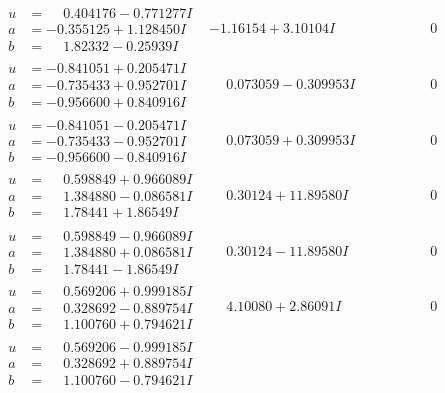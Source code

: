 \documentclass[1p]{elsarticle_modified}
\theoremstyle{definition}
\begin{document}
$$\begin{array}{c|c|c}
\begin{aligned}
u &= \phantom{-}0.404176 - 0.771277 I \\
a &= -0.355125 + 1.128450 I \\
b &= \phantom{-}1.82332 - 0.25939 I\end{aligned}
 & -1.16154 + 3.10104 I & \phantom{-0.000000 } 0 \\ \hline\begin{aligned}
u &= -0.841051 + 0.205471 I \\
a &= -0.735433 + 0.952701 I \\
b &= -0.956600 + 0.840916 I\end{aligned}
 & \phantom{-}0.073059 - 0.309953 I & \phantom{-0.000000 } 0 \\ \hline\begin{aligned}
u &= -0.841051 - 0.205471 I \\
a &= -0.735433 - 0.952701 I \\
b &= -0.956600 - 0.840916 I\end{aligned}
 & \phantom{-}0.073059 + 0.309953 I & \phantom{-0.000000 } 0 \\ \hline\begin{aligned}
u &= \phantom{-}0.598849 + 0.966089 I \\
a &= \phantom{-}1.384880 - 0.086581 I \\
b &= \phantom{-}1.78441 + 1.86549 I\end{aligned}
 & \phantom{-}0.30124 + 11.89580 I & \phantom{-0.000000 } 0 \\ \hline\begin{aligned}
u &= \phantom{-}0.598849 - 0.966089 I \\
a &= \phantom{-}1.384880 + 0.086581 I \\
b &= \phantom{-}1.78441 - 1.86549 I\end{aligned}
 & \phantom{-}0.30124 - 11.89580 I & \phantom{-0.000000 } 0 \\ \hline\begin{aligned}
u &= \phantom{-}0.569206 + 0.999185 I \\
a &= \phantom{-}0.328692 - 0.889754 I \\
b &= \phantom{-}1.100760 + 0.794621 I\end{aligned}
 & \phantom{-}4.10080 + 2.86091 I & \phantom{-0.000000 } 0 \\ \hline\begin{aligned}
u &= \phantom{-}0.569206 - 0.999185 I \\
a &= \phantom{-}0.328692 + 0.889754 I \\
b &= \phantom{-}1.100760 - 0.794621 I\end{aligned}

\end{array}$$
\end{document}
